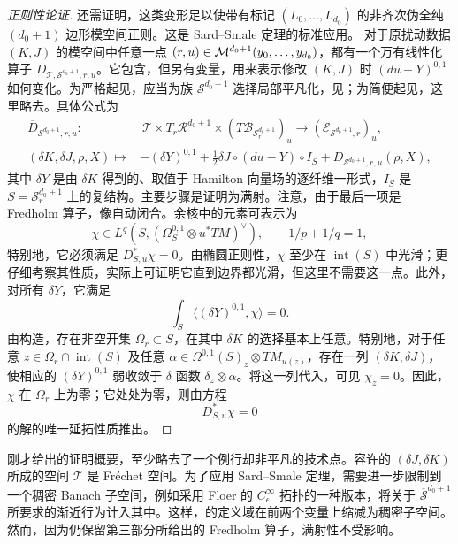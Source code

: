 \begin{proof}[正则性论证]
还需证明，这类变形足以使带有标记 $(L_0,\ldots,L_{d_0})$ 的非齐次伪全纯 $(d_0+1)$ 边形模空间正则。这是 Sard–Smale 定理的标准应用。
对于原扰动数据 $(K,J)$ 的模空间中任意一点 $(r,u)\in\mathcal M^{d_0+1}(y_0,\ldots,y_{d_0})$，都有一个万有线性化算子 $D_{\mathcal T,\mathcal S^{d_0+1},r,u}$。它包含，但另有变量，用来表示修改 $(K,J)$ 时 $(du-Y)^{0,1}$ 如何变化。为严格起见，应当为族 $\mathcal S^{d_0+1}$ 选择局部平凡化，见；为简便起见，这里略去。具体公式为
\begin{equation}\label{eq:9.26}
\begin{aligned}
\overline D_{\mathcal S^{d_0+1},r,u}:&\ \mathcal T\times T_r\mathcal R^{d_0+1}
\times(T\mathcal B_{\mathcal S_r^{d_0+1}})_u\longrightarrow(\mathcal E_{\mathcal S^{d_0+1},r})_u,\\
(\delta K,\delta J,\rho,X)\longmapsto{}&-(\delta Y)^{0,1}
+\tfrac12\delta J\circ(du-Y)\circ I_S+D_{\mathcal S^{d_0+1},r,u}(\rho,X),
\end{aligned}
\end{equation}
其中 $\delta Y$ 是由 $\delta K$ 得到的、取值于 Hamilton 向量场的逐纤维一形式，$I_S$ 是 $S=\mathcal S_r^{d_0+1}$ 上的复结构。主要步骤是证明为满射。注意，由于最后一项是 Fredholm 算子，像自动闭合。余核中的元素可表示为
\[
\chi\in L^q(S,(\Omega_S^{0,1}\otimes u^*TM)^\vee),\qquad 1/p+1/q=1,
\]
特别地，它必须满足 $D_{S,u}^*\chi=0$。由椭圆正则性，$\chi$ 至少在 $\operatorname{int}(S)$ 中光滑；更仔细考察其性质，实际上可证明它直到边界都光滑，但这里不需要这一点。此外，对所有 $\delta Y$，它满足
\begin{equation}\label{eq:9.27}
\int_S\langle(\delta Y)^{0,1},\chi\rangle=0.
\end{equation}
由构造，存在非空开集 $\Omega_r\subset S$，在其中 $\delta K$ 的选择基本上任意。特别地，对于任意 $z\in\Omega_r\cap\operatorname{int}(S)$ 及任意 $\alpha\in\Omega^{0,1}(S)_z\otimes T M_{u(z)}$，存在一列 $(\delta K,\delta J)$，使相应的 $(\delta Y)^{0,1}$ 弱收敛于 $\delta$ 函数 $\delta_z\otimes\alpha$。将这一列代入，可见 $\chi_z=0$。因此，$\chi$ 在 $\Omega_r$ 上为零；它处处为零，则由方程
\[
D_{S,u}^*\chi=0
\]
的解的唯一延拓性质推出。
\end{proof}

\begin{note}\label{st:9.9}
刚才给出的证明概要，至少略去了一个例行却非平凡的技术点。容许的 $(\delta J,\delta K)$ 所成的空间 $\mathcal T$ 是 Fréchet 空间。为了应用 Sard–Smale 定理，需要进一步限制到一个稠密 Banach 子空间，例如采用 Floer 的 $C_\epsilon^\infty$ 拓扑的一种版本，将关于 $\overline{\mathcal S}^{d_0+1}$ 所要求的渐近行为计入其中。这样，的定义域在前两个变量上缩减为稠密子空间。然而，因为仍保留第三部分所给出的 Fredholm 算子，满射性不受影响。
\end{note}

